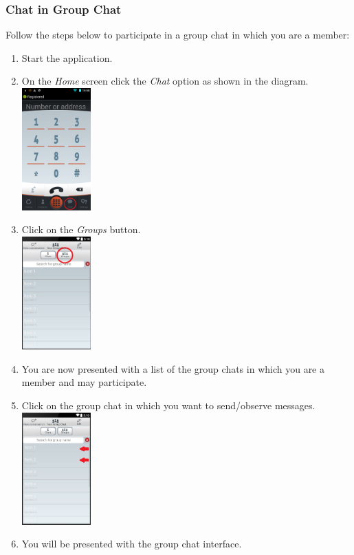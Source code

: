 \documentclass[11pt]{article}
\begin{document}
\subsubsection{Chat in Group Chat}  \label{chat}
Follow the steps below to participate in a group chat in which you are a member:
\begin{enumerate}
\item Start the application.
\item On the \textit{Home} screen click the \textit{Chat} option as shown in the diagram.\\
\includegraphics[width=100px]{images/mainScreen.png}
\item Click on the \textit{Groups} button.\\
\includegraphics[width=100px]{images/ChatlistNav.png}
\item You are now presented with a list of the group chats in which you are a member and may participate.
\item Click on the group chat in which you want to send/observe messages.\\
\includegraphics[width=100px]{images/Grouplist.png}
\item You will be presented with the group chat interface.\\

\end{enumerate}
\end{document}
